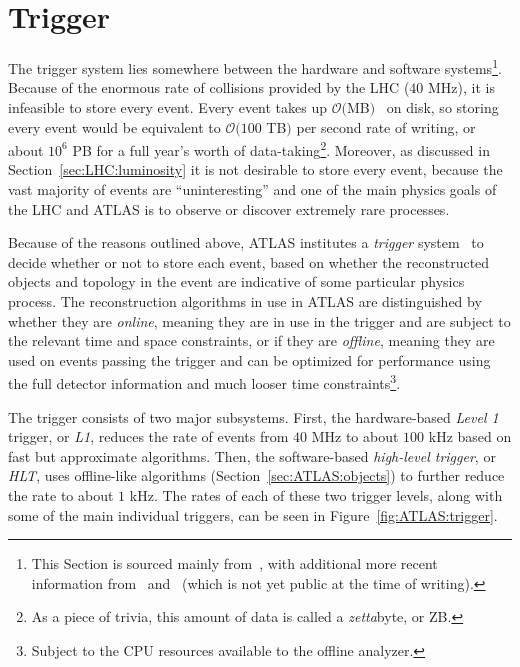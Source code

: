 \section{Trigger}
\label{sec:ATLAS:trigger}
The trigger system lies somewhere between the hardware and software systems\footnote{This Section is sourced mainly from~\cite{TRIG-2016-01}, with additional more recent information from~\cite{Martinez:2016udm} and~\cite{ATLAS-TRIG-2019-04-001} (which is not yet public at the time of writing).}.
Because of the enormous rate of collisions provided by the LHC ($40$ MHz), it is infeasible to store every event.
Every event takes up $\mathcal{O}($MB$)$~\cite{Buckley:2014150} on disk, so storing every event would be equivalent to $\mathcal{O}(100$ TB$)$ per second rate of writing, or about $10^6$ PB for a full year's worth of data-taking\footnote{As a piece of trivia, this amount of data is called a \textit{zetta}byte, or ZB\cite{si-brochure}.}.
Moreover, as discussed in Section~\ref{sec:LHC:luminosity} it is not desirable to store every event, because the vast majority of events are ``uninteresting'' and one of the main physics goals of the LHC and ATLAS is to observe or discover extremely rare processes.

Because of the reasons outlined above, ATLAS institutes a \textit{trigger} system~\cite{TRIG-2016-01} to decide whether or not to store each event, based on whether the reconstructed objects and topology in the event are indicative of some particular physics process.
The reconstruction algorithms in use in ATLAS are distinguished by whether they are \textit{online}, meaning they are in use in the trigger and are subject to the relevant time and space constraints, or if they are \textit{offline}, meaning they are used on events passing the trigger and can be optimized for performance using the full detector information and much looser time constraints\footnote{Subject to the CPU resources available to the offline analyzer.}.

The trigger consists of two major subsystems.
First, the hardware-based \textit{Level 1} trigger, or \textit{L1}, reduces the rate of events from $40$ MHz to about $100$ kHz based on fast but approximate algorithms.
Then, the software-based \textit{high-level trigger}, or \textit{HLT}, uses offline-like algorithms (Section~\ref{sec:ATLAS:objects}) to further reduce the rate to about $1$ kHz.
The rates of each of these two trigger levels, along with some of the main individual triggers, can be seen in Figure~\ref{fig:ATLAS:trigger}.

